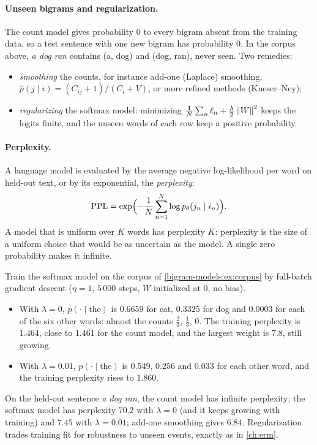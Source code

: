 \begin{notechapter}
\paragraph{Unseen bigrams and regularization.} The count model gives probability $0$ to every
bigram absent from the training data, so a test sentence with one new bigram has
probability $0$. In the corpus above, \emph{a dog ran} contains (a, dog) and (dog, ran), never seen. Two
remedies:
\begin{itemize}[nosep]
  \item \emph{smoothing} the counts, for instance add-one (Laplace) smoothing,
        $\hat p(j\mid i) = (C_{ij} + 1)/(C_i + V)$, or more refined methods (Kneser--Ney);
  \item \emph{regularizing} the softmax model: minimizing $\frac1N\sum_n\ell_n + \frac\lambda2\left\|W\right\|^2$ keeps the logits finite, and
        the unseen words of each row keep a positive probability.
\end{itemize}

\paragraph{Perplexity.} A language model is evaluated by the average negative log-likelihood
per word on held-out text, or by its exponential, the \emph{perplexity}:
\[
  \mathrm{PPL} = \exp\Bigl(-\frac1N\sum_{n=1}^N\log p_\theta(j_n\mid i_n)\Bigr) .
\]
A model that is uniform over $K$ words has perplexity $K$: perplexity is the size of a uniform
choice that would be as uncertain as the model. A single zero probability makes it infinite.

\begin{example}\label{bigram-models:ex:fit}
Train the softmax model on the corpus of \cref{bigram-models:ex:corpus} by full-batch gradient descent
($\eta = 1$, $5\,000$ steps, $W$ initialized at $0$, no bias).
\begin{itemize}[nosep]
  \item With $\lambda = 0$, $p(\cdot\mid\text{the})$ is $0.6659$ for cat, $0.3325$ for dog and $0.0003$ for each of the six other
        words: almost the counts $\frac23$, $\frac13$, $0$. The training perplexity is $1.464$, close to $1.461$ for the
        count model, and the largest weight is $7.8$, still growing.
  \item With $\lambda = 0.01$, $p(\cdot\mid\text{the})$ is $0.549$, $0.256$ and $0.033$ for each other word, and the training
        perplexity rises to $1.860$.
\end{itemize}
On the held-out sentence \emph{a dog ran}, the count model has infinite perplexity; the softmax model
has perplexity $70.2$ with $\lambda = 0$ (and it keeps growing with training) and $7.45$ with $\lambda = 0.01$; add-one
smoothing gives $6.84$. Regularization trades training fit for robustness to unseen events,
exactly as in \cref{ch:erm}.
\end{example}


\end{notechapter}
